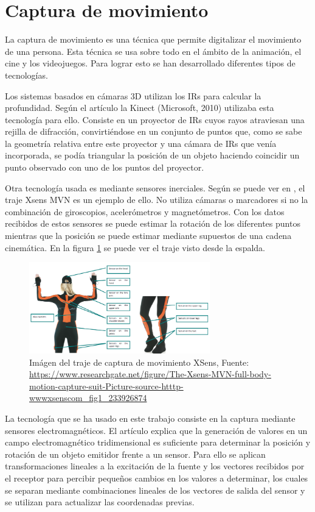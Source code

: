 \section{Captura de movimiento}

La captura de movimiento es una técnica que permite digitalizar el movimiento de una persona. Esta técnica se usa sobre todo en el ámbito de la animación, el cine y los videojuegos.
Para lograr esto se han desarrollado diferentes tipos de tecnologías.

Los sistemas basados en cámaras 3D utilizan los \gls{IRs} para calcular la profundidad. Según el artículo \cite{KINECT} la Kinect (Microsoft, 2010) utilizaba esta tecnología para ello.
Consiste en un proyector de \gls{IRs} cuyos rayos atraviesan una rejilla de difracción, convirtiéndose en un conjunto de puntos que, como se sabe la geometría relativa entre este proyector y una cámara de \gls{IRs} que venía incorporada, se podía triangular la posición de un objeto haciendo coincidir un punto observado con uno de los puntos del proyector.

Otra tecnología usada es mediante sensores inerciales.
Según se puede ver en \cite{XSENS}, el traje Xsens MVN es un ejemplo de ello.
No utiliza cámaras o marcadores si no la combinación de giroscopios, acelerómetros y magnetómetros.
Con los datos recibidos de estos sensores se puede estimar la rotación de los diferentes puntos mientras que la posición se puede estimar mediante supuestos de una cadena cinemática.
En la figura \ref{fig:XSensTraje} se puede ver el traje visto desde la espalda.

\begin{figure}[H]
    \centering
    \includegraphics[width=0.7\textwidth]{Imagenes/Bitmap/XSens.png}
    \caption{Imágen del traje de captura de movimiento XSens, Fuente: \url{https://www.researchgate.net/figure/The-Xsens-MVN-full-body-motion-capture-suit-Picture-source-htttp-wwwxsenscom_fig1_233926874}}
    \label{fig:XSensTraje}
\end{figure}

La tecnología que se ha usado en este trabajo consiste en la captura mediante sensores electromagnéticos.
El artículo \cite{EMS} explica que la generación de valores en un campo electromagnético tridimensional es suficiente para determinar la posición y rotación de un objeto emitidor frente a un sensor.
Para ello se aplican transformaciones lineales a la excitación de la fuente y los vectores recibidos por el receptor para percibir pequeños cambios en los valores a determinar, los cuales se separan mediante combinaciones lineales de los vectores de salida del sensor y se utilizan para actualizar las coordenadas previas.

